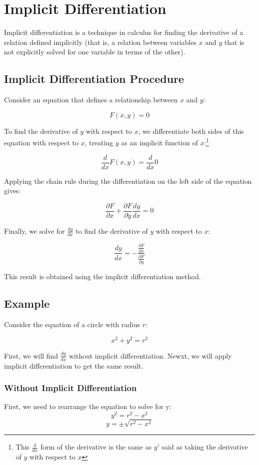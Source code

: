 \chapter{Implicit Differentiation}

Implicit differentiation is a technique in calculus for finding the
derivative of a relation defined implicitly (that is, a relation
between variables $x$ and $y$ that is not explicitly solved for one
variable in terms of the other).

\section{Implicit Differentiation Procedure}

Consider an equation that defines a relationship between $x$ and $y$:

\[
F(x, y) = 0
\]

To find the derivative of $y$ with respect to $x$, we differentiate
both sides of this equation with respect to $x$, treating $y$ as an
implicit function of $x$:\footnote{This $\frac{d}{dx}$ form of the derivative is the same as $y'$ said as taking the derivative of $y$ with respect to $x$}

$$\frac{d}{dx} F(x, y) = \frac{d}{dx} 0$$

Applying the chain rule during the differentiation on the left side of
the equation gives:

$$\frac{\partial F}{\partial x} + \frac{\partial F}{\partial y} 
\frac{dy}{dx} = 0$$

Finally, we solve for $\frac{dy}{dx}$ to find the derivative of $y$
with respect to $x$:

$$\frac{dy}{dx} = 
-\frac{\frac{\partial F}{\partial x}}{\frac{\partial F}{\partial y}}$$

This result is obtained using the implicit differentiation method.

\section{Example}

Consider the equation of a circle with radius $r$:

$$x^2 + y^2 = r^2$$

First, we will find $\frac{dy}{dx}$ without implicit 
differentiation. Newxt, we will apply implicit differentiation to get 
the same result. 

\subsection{Without Implicit Differentiation}
First, we need to rearrange the equation to solve for y: $$y^2 = r^2 
- x^2$$
$$y = \pm \sqrt{r^2 - x^2}$$

